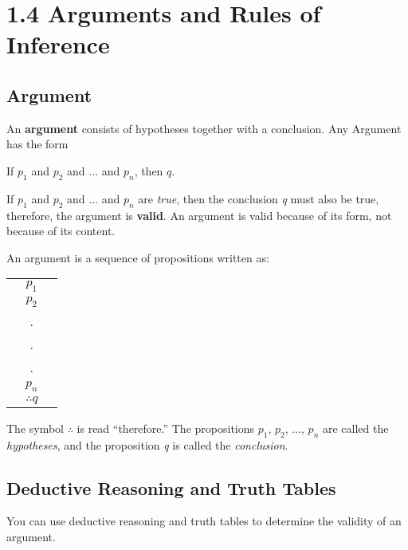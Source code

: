 
\section*{1.4 Arguments and Rules of Inference}

\subsection*{Argument}

An \textbf{argument} consists of hypotheses together with a conclusion.  Any Argument has the form

\begin{center}
    If $p_1$ and $p_2$ and $\dots$ and $p_n$, then $q$.
\end{center}

If $p_1$ and $p_2$ and $\dots$ and $p_n$ are \textit{true}, then the conclusion \textit{q} must also be true, therefore, the argument is \textbf{valid}.  An argument is valid because of its form, not because of its content.

\clearpage

An argument is a sequence of propositions written as:

\begin{table}[h]
\centering
\begin{tabular}{ccc}
  & $p_1$ & \\
  & $p_2$ & \\
  & . & \\
  & . & \\
  & . & \\
  & $p_n$ & \\
\hline
  & $\therefore q$ &
\end{tabular}
\end{table}

The symbol $\therefore$ is read ``therefore.''  The propositions $p_1$, $p_2$, $\dots$, $p_n$ are called the \textit{hypotheses}, and the proposition \textit{q} is called the \textit{conclusion}.\\

\subsection*{Deductive Reasoning and Truth Tables}

You can use deductive reasoning and truth tables to determine the validity of an argument.


